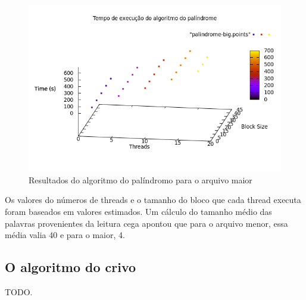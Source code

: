 \documentclass[a4paper]{article}
\begin{document}
\begin{figure}
	\includegraphics[scale=0.5]{palindrome-big}
	\caption{Resultados do algoritmo do palíndromo para o arquivo maior}
	\label{palindrome-big}
\end{figure}
\indent Os valores do números de threads e o tamanho do bloco que cada thread executa foram baseados em valores estimados. Um cálculo do tamanho médio das palavras provenientes da leitura cega apontou que para o arquivo menor, essa média valia 40 e para o maior, 4.

\subsection{O algoritmo do crivo}

\indent \indent TODO.
\end{document}
